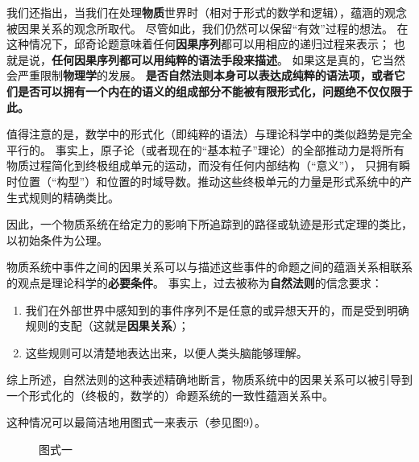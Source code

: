 \documentclass[a4paper,12pt]{article}
\begin{document}
我们还指出，当我们在处理\textbf{\gls{物质}}世界时（相对于形式的数学和\gls{逻辑}），\gls{蕴涵}的观念被\gls{因果关系}的观念所取代。
尽管如此，我们仍然可以保留“有效”过程的想法。 在这种情况下，\gls{邱奇论题}意味着任何\textbf{\gls{因果序列}}都可以用相应的递归过程来表示；
也就是说，\textbf{任何\gls{因果序列}都可以用纯粹的\gls{语法}手段来描述}。 如果这是真的，它当然会严重限制\textbf{物理学}的发展。
\textbf{是否\gls{自然法则}本身可以表达成纯粹的\gls{语法项}，或者它们是否可以拥有一个内在的\gls{语义}的组成部分不能被有限\gls{形式化}，问题绝不仅仅限于此。}

值得注意的是，数学中的\gls{形式化}（即纯粹的\gls{语法}）与理论科学中的类似趋势是完全平行的。
事实上，原子论（或者现在的“基本粒子”理论）的全部推动力是将所有\gls{物质过程}简化到终极组成单元的运动，而没有任何内部结构（“意义”），
只拥有瞬时位置（“构型”）和位置的时域导数。推动这些终极单元的力量是\gls{形式系统}中的产生式规则的精确类比。

因此，一个\gls{物质系统}在给定力的影响下所追踪到的路径或轨迹是形式定理的类比，以初始条件为\gls{公理}。

\gls{物质系统}中\gls{事件}之间的\gls{因果关系}可以与描述这些事件的\gls{命题}之间的\gls{蕴涵关系}相联系的观点是理论科学的\textbf{必要条件}。
事实上，过去被称为\textbf{\gls{自然法则}}的信念要求：
\begin{enumerate}[label=(\alph*)]
\item 我们在外部世界中感知到的\gls{事件序列}不是任意的或异想天开的，而是受到明确规则的支配（这就是\textbf{\gls{因果关系}}）；
\item 这些规则可以清楚地表达出来，以便人类头脑能够理解。
\end{enumerate}
综上所述，\gls{自然法则}的这种表述精确地断言，\gls{物质系统}中的\gls{因果关系}可以被引导到一个\gls{形式化}的（终极的，数学的）\gls{命题系统}的一致性\gls{蕴涵关系}中。

这种情况可以最简洁地用图式一来表示（参见图9）。

\begin{figure}[ht]
\centering
{}
\caption{图式一}
\end{figure}
\end{document}
